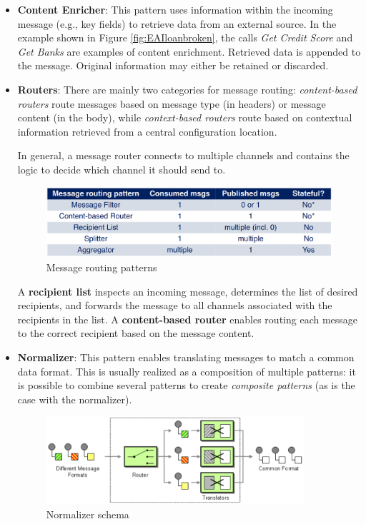 \begin{itemize}
    \item \textbf{Content Enricher}: This pattern uses information within the incoming message (e.g., key fields) to retrieve data from an external source. In the example shown in Figure \ref{fig:EAIloanbroken}, the calls \emph{Get Credit Score} and \emph{Get Banks} are examples of content enrichment. Retrieved data is appended to the message. Original information may either be retained or discarded.
    \item \textbf{Routers}: There are mainly two categories for message routing: \emph{content-based routers} route messages based on message type (in headers) or message content (in the body), while \emph{context-based routers} route based on contextual information retrieved from a central configuration location.
    
    In general, a message router connects to multiple channels and contains the logic to decide which channel it should send to.

    \begin{figure} [H]
        \centering
        \includegraphics[width=1\textwidth]{images/SoftwareArchitecture/messageRoutingpattern.png}
        \caption{Message routing patterns}
        \label{fig:messageRoutingpattern}
    \end{figure}
    
    A \textbf{recipient list} inspects an incoming message, determines the list of desired recipients, and forwards the message to all channels associated with the recipients in the list. A \textbf{content-based router} enables routing each message to the correct recipient based on the message content.
    \item \textbf{Normalizer}: This pattern enables translating messages to match a common data format. This is usually realized as a composition of multiple patterns: it is possible to combine several patterns to create \emph{composite patterns} (as is the case with the normalizer).
    
    \begin{figure} [H]
        \centering
        \includegraphics[width=0.9\textwidth]{images/SoftwareArchitecture/normalizer.png}
        \caption{Normalizer schema}
        \label{fig:normalizer}
    \end{figure}


\end{itemize}
